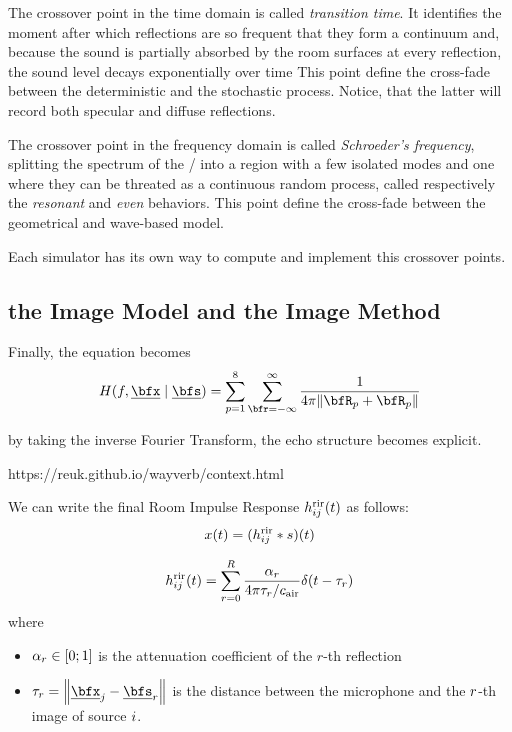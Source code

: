 
The crossover point in the time domain is called \textit{transition time}.
It identifies the moment after which reflections are so frequent that they form a continuum and, because the sound is partially absorbed by the room surfaces at every reflection, the sound level decays exponentially over time \cite{Badeau2019common}
This point define the cross-fade between the deterministic and the stochastic process.
Notice, that the latter will record both specular and diffuse reflections.

The crossover point in the frequency domain is called \textit{Schroeder's frequency}, splitting the
spectrum of the \RIR/ into a region with a few isolated modes and one where they can be threated as a
continuous random process, called respectively the \textit{resonant} and \textit{even} behaviors.
This point define the cross-fade between the geometrical and wave-based model.

Each simulator has its own way to compute and implement this crossover points.


\subsection{the Image Model and the Image Method}
Finally, the equation becomes
\begin{equation}
    \label{eq:acoustics:ims:frourier}
    H(f, \positionMicrophone \mid \positionSource) =
        \sum_{p=1}^{8}
            \sum_{\pos=-\infty}^{\infty}
                \frac{1}{4 \pi \norm{\coordinatePermutation_p +  \coordinatePermutation_p}}
\end{equation}

by taking the inverse Fourier Transform, the echo structure becomes explicit.

https://reuk.github.io/wayverb/context.html

We can write the final Room Impulse Response $h^{\text{rir}}_{ij}(t)$ as follows:
\begin{equation}
    x(t) = (h^{\text{rir}}_{ij} \ast s)(t)
\end{equation}

\begin{equation}
    \rir_{ij}(t) = \sum_{r=0}^{R} \frac{\alpha_r}{4 \pi \tau_r / \cair} \delta \kparen{t - \tau_r}
\end{equation}
where
\begin{itemize}
    \item $\alpha_r \in \kintervcc{0}{1}$ is the attenuation coefficient of the $r$-th reflection
    \item $\tau_r = \norm{\positionMicrophone_\idxMic - \positionSource_\idxEch}$ is the distance between the microphone and the $r$-th image of source $i$.
\end{itemize}

